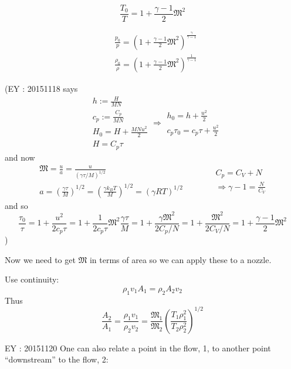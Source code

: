 \documentclass[10pt]{amsart}
\begin{document}
\begin{multicols*}{2}
\begin{equation}
\boxed{ \frac{T_0}{T} = 1 + \frac{\gamma - 1 }{2} \mathfrak{M}^2 }
\end{equation}

\[
\begin{aligned}
  & \frac{p_0}{p} = \left( 1 + \frac{\gamma -1}{2} \mathfrak{M}^2 \right)^{\frac{\gamma}{\gamma - 1 } } \\ 
  &  \frac{\rho_0}{\rho } = \left( 1 + \frac{\gamma - 1}{2} \mathfrak{M}^2 \right)^{\frac{1}{\gamma - 1 } }
\end{aligned}
\]

(EY : 20151118 says 
\[
\begin{aligned}
  & h := \frac{H}{MN} \\ 
  & c_p := \frac{C_p}{MN} \\ 
  & H_0 = H + \frac{MNu^2}{2} \\
  & H = C_p \tau 
\end{aligned} \Longrightarrow \begin{gathered}
  h_0 = h + \frac{u^2}{2} \\
  c_p \tau_0 = c_p \tau + \frac{u^2}{2} 
\end{gathered}
\]
and now 
\[
\begin{gathered}
  \mathfrak{M} = \frac{u}{a} = \frac{u}{ (\gamma \tau / M )^{1/2}} \\ 
  a = \left( \frac{ \gamma \tau }{M} \right)^{1/2} = \left( \frac{ \gamma k_B T }{ M} \right)^{1/2} = (\gamma R T)^{1/2} 
\end{gathered} \quad \quad \quad \, \begin{gathered}
  C_p = C_V + N \\
\Longrightarrow   \gamma- 1 = \frac{N}{C_V}
\end{gathered}
\]
and so 
\[
\frac{\tau_0}{\tau} = 1 + \frac{u^2}{2 c_p \tau } = 1 + \frac{1}{2 c_p \tau} \mathfrak{M}^2 \frac{\gamma \tau }{M} = 1 + \frac{ \gamma \mathfrak{M}^2 }{2 C_p /N} = 1 + \frac{ \mathfrak{M}^2}{ 2 C_V / N} = 1 + \frac{\gamma -1}{2} \mathfrak{M}^2
\])

Now we need to get $\mathfrak{M}$ in terms of area so we can apply these to a nozzle.  

Use continuity: 
\[
\rho_1 v_1 A_1 = \rho_2 A_2 v_2
\]
Thus
\[
\frac{A_2}{A_1} = \frac{ \rho_1 v_1}{ \rho_2 v_2} = \frac{ \mathfrak{M}_1}{\mathfrak{M}_2} \left( \frac{ T_1 \rho_1^2 }{ T_2 \rho_2^2} \right)^{1/2}
\]

EY : 20151120 One can also relate a point in the flow, 1, to another point ``downstream'' to the flow, 2:


\end{multicols*}
\end{document}
